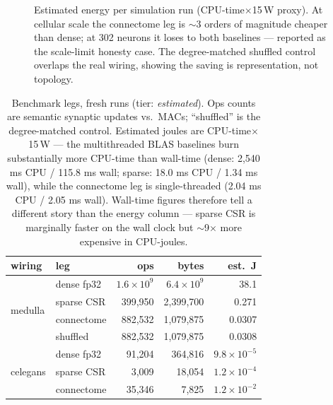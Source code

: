 \documentclass[pdflatex,sn-basic]{sn-jnl}
\begin{document}
\begin{figure}[t]
\centering
{}
\caption{Estimated energy per simulation run (CPU-time$\times$15\,W
proxy). At cellular scale the connectome leg is $\sim$3 orders of
magnitude cheaper than dense; at 302 neurons it loses to both
baselines --- reported as the scale-limit honesty case. The
degree-matched shuffled control overlaps the real wiring, showing the
saving is representation, not topology.}\label{fig:bench}
\end{figure}

\begin{table}[t]
\centering\small
\caption{Benchmark legs, fresh runs (tier: \emph{estimated}). Ops
counts are semantic synaptic updates vs.\ MACs; ``shuffled'' is the
degree-matched control. Estimated joules are
CPU-time$\times$15\,W --- the multithreaded BLAS baselines burn
substantially more CPU-time than wall-time (dense: 2{,}540 ms CPU /
115.8 ms wall; sparse: 18.0 ms CPU / 1.34 ms wall), while the
connectome leg is single-threaded (2.04 ms CPU / 2.05 ms wall).
Wall-time figures therefore tell a different story than the energy
column --- sparse CSR is marginally faster on the wall clock but
$\sim$9$\times$ more expensive in CPU-joules.}\label{tab:bench}
\begin{tabular}{@{}llrrr@{}}
\toprule
wiring & leg & ops & bytes & est.\ J \\
\midrule
\multirow{4}{*}{medulla}
 & dense fp32  & $1.6\!\times\!10^9$ & $6.4\!\times\!10^9$ & 38.1 \\
 & sparse CSR  & 399{,}950 & 2{,}399{,}700 & 0.271 \\
 & connectome  & 882{,}532 & 1{,}079{,}875 & 0.0307 \\
 & shuffled    & 882{,}532 & 1{,}079{,}875 & 0.0308 \\
\midrule
\multirow{3}{*}{celegans}
 & dense fp32  & 91{,}204 & 364{,}816 & $9.8\!\times\!10^{-5}$ \\
 & sparse CSR  & 3{,}009  & 18{,}054  & $1.2\!\times\!10^{-4}$ \\
 & connectome  & 35{,}346 & 7{,}825   & $1.2\!\times\!10^{-2}$ \\
\bottomrule
\end{tabular}
\end{table}
\end{document}
